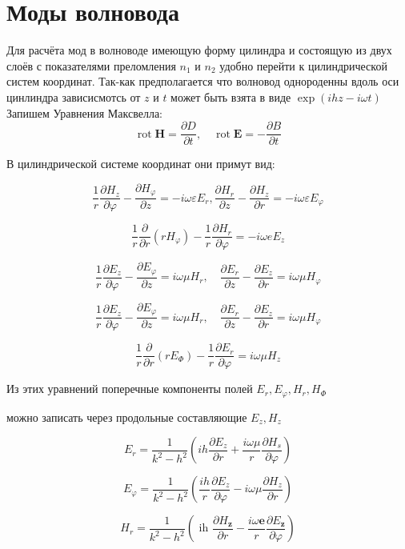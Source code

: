 \section{Моды волновода}

Для расчёта мод в волноводе имеющую форму цилиндра и состоящую из двух слоёв с показателями преломления $ n_1 $ и $ n_2 $ удобно перейти к цилиндрической систем координат. Так-как предполагается что волновод  однороденны вдоль оси цинлиндра зависисмотсь от $ z $ и $ t $ может быть взята в виде $\exp (i h z-i \omega t)$
Запишем Уравнения Максвелла:
$$\operatorname{rot} \mathbf{H}=\frac{\partial D}{\partial t}, \quad \operatorname{rot} \mathbf{E}=-\frac{\partial B}{\partial t}$$

В цилиндрической системе координат они примут вид:

$$\frac{1}{r} \frac{\partial H_{z}}{\partial \varphi}-\frac{\partial H_{\varphi}}{\partial z}=-i \omega \varepsilon E_{r}, \frac{\partial H_{r}}{\partial z}-\frac{\partial H_{z}}{\partial r}=-i \omega \varepsilon E_{\varphi}$$

$$\frac{1}{r} \frac{\partial}{\partial r}\left(r H_{\varphi}\right)-\frac{1}{r} \frac{\partial H_{r}}{\partial \varphi}=-i \omega e E_{z}$$

$$\frac{1}{r} \frac{\partial E_{z}}{\partial \varphi}-\frac{\partial E_{\varphi}}{\partial z}=i \omega \mu H_{r}, \quad \frac{\partial E_{r}}{\partial z}-\frac{\partial E_{z}}{\partial r}=i \omega \mu H_{\varphi}$$

$$\frac{1}{r} \frac{\partial E_{z}}{\partial \varphi}-\frac{\partial E_{\varphi}}{\partial z}=i \omega \mu H_{r}, \quad \frac{\partial E_{r}}{\partial z}-\frac{\partial E_{z}}{\partial r}=i \omega \mu H_{\varphi}$$

$$\frac{1}{r} \frac{\partial}{\partial r}\left(r E_{\Phi}\right)-\frac{1}{r} \frac{\partial E_{r}}{\partial \varphi}=i \omega \mu H_{z}$$


Из этих уравнений поперечные компоненты полей $E_{r}, E_{\varphi}, H_{r}, H_{\Phi}$

можно записать через продольные составляющие $E_{z}, H_{z}$

$$E_{r}=\frac{1}{k^{2}-h^{2}}\left(ih \frac{\partial E_{z}}{\partial r}+\frac{i \omega \mu}{r} \frac{\partial H_{s}}{\partial \varphi}\right)$$

$$E_{\varphi}=\frac{1}{k^{2}-h^{2}}\left(\frac{i h}{r} \frac{\partial E_{z}}{\partial \varphi}-i \omega \mu \frac{\partial H_{z}}{\partial r}\right)$$

$$H_{r}=\frac{1}{k^{2}-h^{2}}\left(\text { ih } \frac{\partial H_{\mathbf{z}}}{\partial r}-\frac{i \omega \mathbf{e}}{r} \frac{\partial E_{\mathbf{z}}}{\partial \varphi}\right)$$


